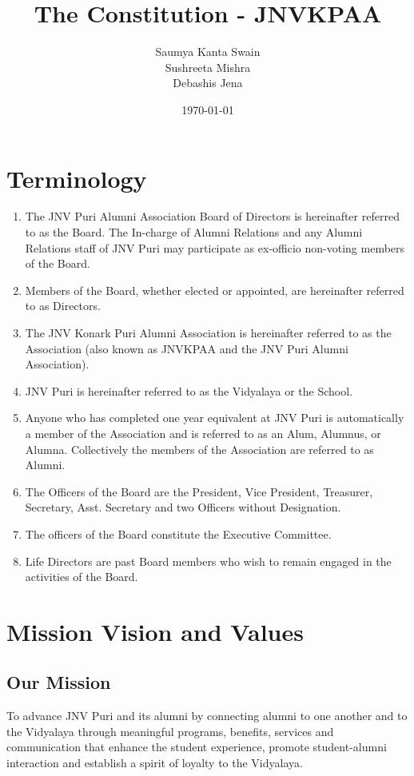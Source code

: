 \documentclass[a4paper,11pt]{book}
\title{The Constitution - JNVKPAA}
\author{Saumya Kanta Swain \\
Sushreeta Mishra \\
Debashis Jena}
\date{\today}
\begin{document}
\maketitle
\tableofcontents

\chapter*{Terminology}
\begin{enumerate}
\item The JNV Puri Alumni Association Board of Directors is hereinafter 
referred to as the Board. The In-charge of Alumni Relations and any Alumni 
Relations staff of JNV Puri may participate as ex-officio non-voting members of the Board.
\item Members of the Board, whether elected or appointed, are hereinafter referred to as Directors.
\item The JNV Konark Puri Alumni Association is hereinafter referred to as the Association (also known as JNVKPAA and the JNV Puri Alumni Association).
\item JNV Puri is hereinafter referred to as the Vidyalaya or the School.
\item Anyone who has completed one year equivalent at JNV Puri is automatically a member of the Association and is referred to as an Alum, Alumnus, or Alumna. Collectively the members of the Association are referred to as Alumni.
\item The Officers of the Board are the President, Vice President, Treasurer, Secretary, Asst. Secretary and two Officers without Designation.
\item The officers of the Board constitute the Executive Committee.
\item Life Directors are past Board members who wish to remain engaged in the activities of the Board.
\end{enumerate}

\chapter{Mission Vision and Values}

\section{Our Mission}
To advance JNV Puri and its alumni by connecting alumni to one another 
and to the Vidyalaya through meaningful programs, benefits, services and 
communication that enhance the student experience, promote student-alumni 
interaction and establish a spirit of loyalty to the Vidyalaya.
\end{document}
